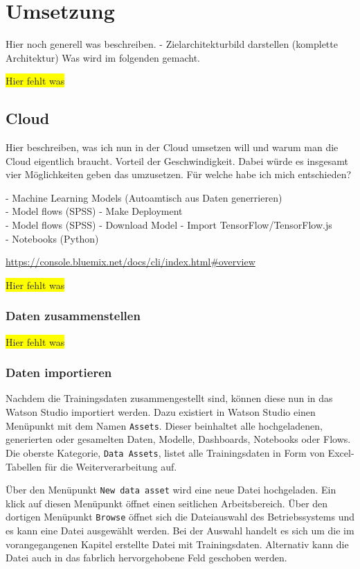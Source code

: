 \section{Umsetzung}
Hier noch generell was beschreiben. - Zielarchitekturbild darstellen (komplette Architektur)
Was wird im folgenden gemacht.

\colorbox{yellow}{Hier fehlt was}

\subsection{Cloud}
Hier beschreiben, was ich nun in der Cloud umsetzen will und warum man die Cloud eigentlich braucht. Vorteil der
Geschwindigkeit. Dabei würde es insgesamt vier Möglichkeiten geben das umzusetzen. Für welche habe ich mich
entschieden?

- Machine Learning Models (Autoamtisch aus Daten generrieren)\\
- Model flows (SPSS) - Make Deployment\\
- Model flows (SPSS) - Download Model - Import TensorFlow/TensorFlow.js\\
- Notebooks (Python)

\url{https://console.bluemix.net/docs/cli/index.html#overview}

\colorbox{yellow}{Hier fehlt was}

\subsubsection{Daten zusammenstellen}
\colorbox{yellow}{Hier fehlt was}

\subsubsection{Daten importieren}
Nachdem die Trainingsdaten zusammengestellt sind, können diese nun in das Watson Studio importiert werden. Dazu existiert
in Watson Studio einen Menüpunkt mit dem Namen \texttt{Assets}. Dieser beinhaltet alle hochgeladenen, generierten oder
gesamelten Daten, Modelle, Dashboards, Notebooks oder Flows. Die oberste Kategorie, \texttt{Data Assets}, listet alle
Trainingsdaten in Form von Excel-Tabellen für die Weiterverarbeitung auf.

Über den Menüpunkt \texttt{New data asset} wird eine neue Datei hochgeladen. Ein klick auf diesen Menüpunkt öffnet einen
seitlichen Arbeitsbereich. Über den dortigen Menüpunkt \texttt{Browse} öffnet sich die Dateiauswahl des Betriebssystems
und es kann eine Datei ausgewählt werden. Bei der Auswahl handelt es sich um die im vorangegangenen Kapitel erstellte
Datei mit Trainingsdaten. Alternativ kann die Datei auch in das fabrlich hervorgehobene Feld geschoben werden.

